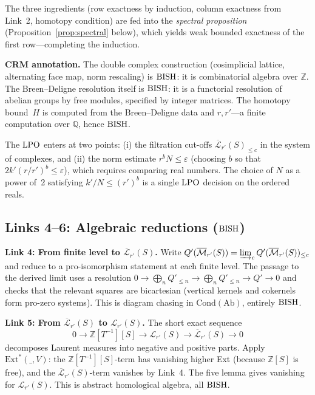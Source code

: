 \documentclass[11pt,a4paper]{article}
\theoremstyle{plain}
\theoremstyle{definition}
\newcommand{\BISH}{\textup{BISH}}
\newcommand{\LPO}{\textup{LPO}}
\newcommand{\Z}{\mathbb{Z}}
\newcommand{\Q}{\mathbb{Q}}
\begin{document}
\noindent The three ingredients (row exactness by induction, column
exactness from Link~2, homotopy condition) are fed into the
\emph{spectral proposition} (Proposition~\ref{prop:spectral} below),
which yields weak bounded exactness of the first row---completing
the induction.

\medskip
\noindent\textbf{CRM annotation.}
The double complex construction (cosimplicial lattice, alternating
face map, norm rescaling) is $\BISH$: it is combinatorial algebra
over $\Z$.  The Breen--Deligne resolution itself is $\BISH$: it is a
functorial resolution of abelian groups by free modules, specified by
integer matrices.  The homotopy bound~$H$ is computed from the
Breen--Deligne data and $r, r'$---a finite computation over $\Q$,
hence $\BISH$.

The $\LPO$ enters at two points: (i) the filtration cut-offs
$\overline{\mathcal{L}}_{r'}(S)_{\leq c}$ in the system of complexes,
and (ii) the norm estimate $r^b N \leq \varepsilon$ (choosing $b$
so that $2k'(r/r')^b \leq \varepsilon$), which requires comparing
real numbers.  The choice of $N$ as a power of~2 satisfying
$k'/N \leq (r')^b$ is a single $\LPO$ decision on the ordered
reals.

\subsection{Links 4--6: Algebraic reductions ($\BISH$)}

\noindent\textbf{Link 4: From finite level to $\overline{\mathcal{L}}_{r'}(S)$.}
Write $Q'(\overline{\mathcal{M}}_{r'}(S)) = \varinjlim_c
Q'(\overline{\mathcal{M}}_{r'}(S))_{\leq c}$ and reduce to a
pro-isomorphism statement at each finite level.  The passage to the
derived limit uses a resolution
$0 \to \bigoplus_n Q'_{\leq n} \to \bigoplus_n Q'_{\leq n} \to
Q' \to 0$
and checks that the relevant squares are bicartesian (vertical kernels
and cokernels form pro-zero systems).  This is diagram chasing in
$\mathrm{Cond}(\mathrm{Ab})$, entirely $\BISH$.

\medskip
\noindent\textbf{Link 5: From $\overline{\mathcal{L}}_{r'}(S)$
to $\mathcal{L}_{r'}(S)$.}
The short exact sequence
\[
  0 \longrightarrow \Z[T^{-1}][S] \longrightarrow
  \mathcal{L}_{r'}(S) \longrightarrow
  \overline{\mathcal{L}}_{r'}(S) \longrightarrow 0
\]
decomposes Laurent measures into negative and positive parts.
Apply $\mathrm{Ext}^*(\_, V)$: the $\Z[T^{-1}][S]$-term has
vanishing higher Ext (because $\Z[S]$ is free), and the
$\overline{\mathcal{L}}_{r'}(S)$-term vanishes by Link~4.
The five lemma gives vanishing for $\mathcal{L}_{r'}(S)$.
This is abstract homological algebra, all $\BISH$.
\end{document}
